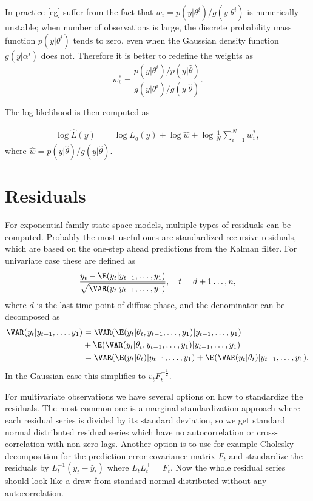 \documentclass[nojss,article]{jss}\usepackage[]{graphicx}\usepackage[]{color}
\begin{document}
In practice \eqref{eg} suffer from the fact that $w_i= p(y|\theta^i)/g(y|\theta^i)$ is numerically unstable; when number of observations is large, the discrete probability mass function $p(y|\theta^i)$ tends to zero, even when the Gaussian density function $g(y|\alpha^i)$ does not. Therefore it is better to redefine the weights as 
\begin{equation*}
w^*_i = \frac{p(y|\theta^i)/p(y|\hat\theta)}{g(y|\theta^i)/g(y|\hat \theta)}.
\end{equation*}

The log-likelihood is then computed as 

\begin{equation*}
\begin{aligned}
\log \hat L(y) &= \log L_g(y) + \log \hat w + \log\frac{1}{N}\sum_{i=1}^Nw^*_i,
\end{aligned}
\end{equation*}
where $\hat w = p(y|\hat \theta)/g(y|\hat \theta)$.

\section{Residuals}\label{residuals}

For exponential family state space models, multiple types of residuals can be computed. Probably the most useful ones are standardized recursive residuals, which are based on the one-step ahead predictions from the Kalman filter. For univariate case these are defined as
\begin{equation*}
\frac{y_t-\E(y_t|y_{t-1},\ldots,y_1)}{\sqrt{\VAR(y_t|y_{t-1},\ldots,y_1)}},\quad t = d+1\ldots,n,
\end{equation*}
where $d$ is the last time point of diffuse phase, and the denominator can be decomposed as
\begin{equation*}
\begin{aligned}
\VAR(y_t|y_{t-1},\ldots,y_1)&= \VAR(\E(y_t|\theta_t,y_{t-1},\ldots,y_1)|y_{t-1},\ldots,y_1)\\
&+ \E(\VAR(y_t|\theta_t,y_{t-1},\ldots,y_1)|y_{t-1},\ldots,y_1)\\
&= \VAR(\E(y_t|\theta_t)| y_{t-1},\ldots,y_1) + \E(\VAR(y_t|\theta_t)|y_{t-1},\ldots,y_1) .
\end{aligned}
\end{equation*}
In the Gaussian case this simplifies to $v_{t}F_{t}^{-\frac{1}{2}}$.

For multivariate observations we have several options on how to standardize the residuals. The most common one is a marginal standardization approach where each residual series is divided by its standard deviation, so we get standard normal distributed residual series which have no autocorrelation or cross-correlation with non-zero lags. Another option is to use for example Cholesky decomposition for the prediction error covariance matrix $F_t$ and standardize the residuals by $L_t^{-1}(y_t-\hat y_t)$ where $L_t L_t^\top=F_t$. Now the whole residual series should look like a draw from standard normal distributed without any autocorrelation. 
\end{document}
